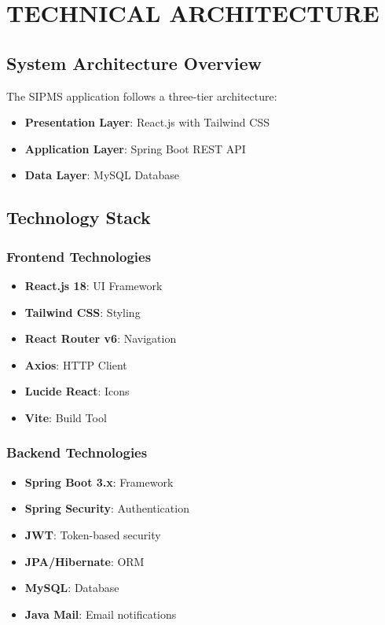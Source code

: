\documentclass[12pt,a4paper]{report}
\begin{document}
\chapter{TECHNICAL ARCHITECTURE}

\section{System Architecture Overview}
The SIPMS application follows a three-tier architecture:

\begin{itemize}
    \item \textbf{Presentation Layer}: React.js with Tailwind CSS
    \item \textbf{Application Layer}: Spring Boot REST API
    \item \textbf{Data Layer}: MySQL Database
\end{itemize}

\section{Technology Stack}

\subsection{Frontend Technologies}
\begin{itemize}
    \item \textbf{React.js 18}: UI Framework
    \item \textbf{Tailwind CSS}: Styling
    \item \textbf{React Router v6}: Navigation
    \item \textbf{Axios}: HTTP Client
    \item \textbf{Lucide React}: Icons
    \item \textbf{Vite}: Build Tool
\end{itemize}

\subsection{Backend Technologies}
\begin{itemize}
    \item \textbf{Spring Boot 3.x}: Framework
    \item \textbf{Spring Security}: Authentication
    \item \textbf{JWT}: Token-based security
    \item \textbf{JPA/Hibernate}: ORM
    \item \textbf{MySQL}: Database
    \item \textbf{Java Mail}: Email notifications
\end{itemize}
\end{document}
